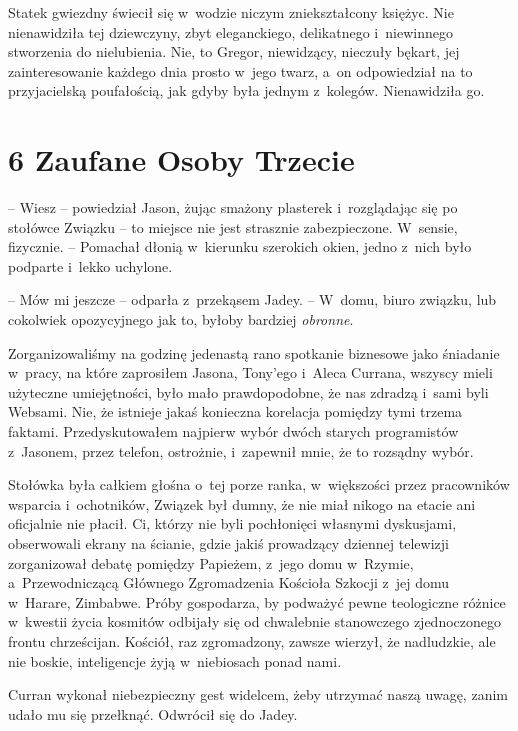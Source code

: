 \documentclass[oneside,polish,12pt,sfheadings]{mwbk}
\begin{document}
Statek gwiezdny świecił się w~wodzie niczym zniekształcony księżyc. Nie
nienawidziła tej dziewczyny, zbyt eleganckiego, delikatnego i~niewinnego
stworzenia do nielubienia. Nie, to Gregor, niewidzący, nieczuły bękart,
jej zainteresowanie każdego dnia prosto w~jego twarz, a~on odpowiedział
na to przyjacielską poufałością, jak gdyby była jednym z~kolegów.
Nienawidziła go.



\chapter[Zaufane Osoby Trzecie]{6 Zaufane Osoby Trzecie}


-- Wiesz -- powiedział Jason, żując smażony plasterek i~rozglądając się po
stołówce Związku -- to miejsce nie jest strasznie zabezpieczone. W~sensie, fizycznie. -- Pomachał dłonią w~kierunku szerokich okien, jedno z~nich było podparte i~lekko uchylone.

-- Mów mi jeszcze -- odparła z~przekąsem Jadey. -- W~domu, biuro związku,
lub cokolwiek opozycyjnego jak to, byłoby bardziej \emph{obronne}.

Zorganizowaliśmy na godzinę jedenastą rano spotkanie biznesowe jako
śniadanie w~pracy, na które zaprosiłem Jasona, Tony'ego i~Aleca Currana,
wszyscy mieli użyteczne umiejętności, było mało prawdopodobne, że nas
zdradzą i~sami byli Websami. Nie, że istnieje jakaś konieczna korelacja
pomiędzy tymi trzema faktami. Przedyskutowałem najpierw wybór dwóch
starych programistów z~Jasonem, przez telefon, ostrożnie, i~zapewnił
mnie, że to rozsądny wybór.

Stołówka była całkiem głośna o~tej porze ranka, w~większości przez
pracowników wsparcia i~ochotników, Związek był dumny, że nie miał nikogo
na etacie ani oficjalnie nie płacił. Ci, którzy nie byli pochłonięci
własnymi dyskusjami, obserwowali ekrany na ścianie, gdzie jakiś
prowadzący dziennej telewizji zorganizował debatę pomiędzy Papieżem, z~jego domu w~Rzymie, a~Przewodniczącą Głównego Zgromadzenia Kościoła
Szkocji z~jej domu w~Harare, Zimbabwe. Próby gospodarza, by podważyć
pewne teologiczne różnice w~kwestii życia kosmitów odbijały się od
chwalebnie stanowczego zjednoczonego frontu chrześcijan. Kościół, raz
zgromadzony, zawsze wierzył, że nadludzkie, ale nie boskie, inteligencje
żyją w~niebiosach ponad nami.

Curran wykonał niebezpieczny gest widelcem, żeby utrzymać naszą uwagę,
zanim udało mu się przełknąć. Odwrócił się do Jadey. 
\end{document}
